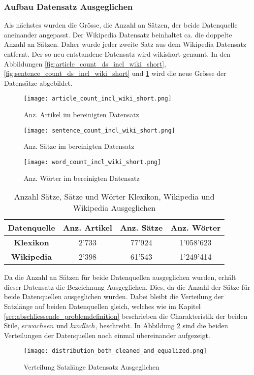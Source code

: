 \subsubsection{Aufbau Datensatz \flqq Ausgeglichen\frqq}
\label{sub:datensatz_ausgeglichen}
Als nächstes wurden die Grösse,  die Anzahl an Sätzen, der beide Datenquelle aneinander angepasst. Der Wikipedia
Datensatz beinhaltet ca. die doppelte Anzahl an Sätzen. Daher wurde jeder zweite Satz aus dem Wikipedia Datensatz
entfernt. Der so neu entstandene Datensatz wird wikishort genannt. In den Abbildungen
\ref{fig:article_count_ds_incl_wiki_short}, \ref{fig:sentence_count_ds_incl_wiki_short} und
\ref{fig:word_count_ds_incl_wiki_short} wird die neue Grösse der Datensätze abgebildet.
\begin{figure}[H]
    \texttt{[image: article\_count\_incl\_wiki\_short.png]}
    \caption{Anz. Artikel im bereinigten Datensatz}\label{fig:article_count_ds_incl_wiki_short}
  \endminipage\hfill
    \texttt{[image: sentence\_count\_incl\_wiki\_short.png]}
    \caption{Anz. Sätze im bereinigten Datensatz}\label{fig:sentence_count_ds_incl_wiki_short}
  \endminipage\hfill
    \texttt{[image: word\_count\_incl\_wiki\_short.png]}
    \caption{Anz. Wörter im bereinigten Datensatz}\label{fig:word_count_ds_incl_wiki_short}
  \endminipage      
\end{figure}
\begin{table}[H]
  \centering
  \begin{tabular}{|c|c|c|c|}
      \hline
      \textbf{Datenquelle}& \textbf{Anz. Artikel}& \textbf{Anz. Sätze}& \textbf{Anz. Wörter}\\
      \hline
      \textbf{Klexikon}& 2'733 & 77'924 & 1'058'623\\
      \hline
      \textbf{Wikipedia}& 2'398 & 61'543 & 1'249'414\\
      \hline
  \end{tabular}
  \caption{Anzahl Sätze, Sätze und Wörter Klexikon, Wikipedia und Wikipedia \flqq Ausgeglichen\frqq}  
\label{tab:count_klexi_wiki_short}
\end{table}

\noindent
Da die Anzahl an Sätzen für beide Datenquellen ausgeglichen wurden, erhält dieser Datensatz die Bezeichnung \flqq
Ausgeglichen\frqq. Dies, da die Anzahl der Sätze für beide Datenquellen ausgeglichen wurden. Dabei bleibt die Verteilung
der Satzlänge auf beiden Datenquellen gleich, welches wie im Kapitel \ref{sec:abschliessende_problemdefinition}
beschrieben die Charakteristik der beiden Stile, $ erwachsen $ und $ kindlich $, beschreibt. In Abbildung
\ref{fig:distribution_both_cleaned_and_equalized} sind die beiden Verteilungen der Datenquellen noch einmal übereinander
aufgezeigt.
\begin{figure}[H]
	\centering
	\texttt{[image: distribution\_both\_cleaned\_and\_equalized.png]}
	\caption{Verteilung Satzlänge Datensatz \flqq Ausgeglichen\frqq}
	\label{fig:distribution_both_cleaned_and_equalized}
\end{figure}


